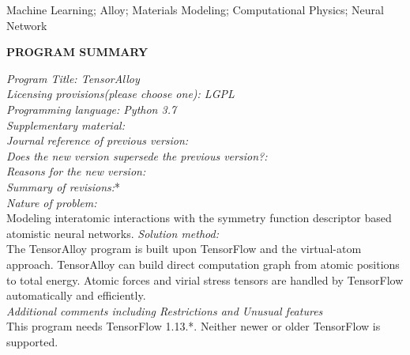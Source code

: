 \documentclass[final,1p,times]{elsarticle}
\begin{document}
\begin{frontmatter}
\begin{keyword}
Machine Learning; Alloy; Materials Modeling; Computational Physics; 
Neural Network

\end{keyword}

\end{frontmatter}



{\bf PROGRAM SUMMARY} \\
\begin{small}
\noindent
{\em Program Title: TensorAlloy} \\
{\em Licensing provisions(please choose one): LGPL}           \\
{\em Programming language: Python 3.7}                        \\
{\em Supplementary material:}                                 \\
{\em Journal reference of previous version:}                  \\
{\em Does the new version supersede the previous version?:}   \\
{\em Reasons for the new version:} \\
{\em Summary of revisions:}*\\
{\em Nature of problem:} \\
  Modeling interatomic interactions with the symmetry function descriptor based
  atomistic neural networks.
{\em Solution method:} \\
  The TensorAlloy program is built upon TensorFlow and the virtual-atom 
  approach. TensorAlloy can build direct computation graph from atomic positions 
  to total energy. Atomic forces and virial stress tensors are handled by 
  TensorFlow automatically and efficiently. \\
{\em Additional comments including Restrictions and Unusual features}\\
  This program needs TensorFlow 1.13.*. Neither newer or older TensorFlow is 
  supported. \\
\end{small}

% 
%
\end{document}

